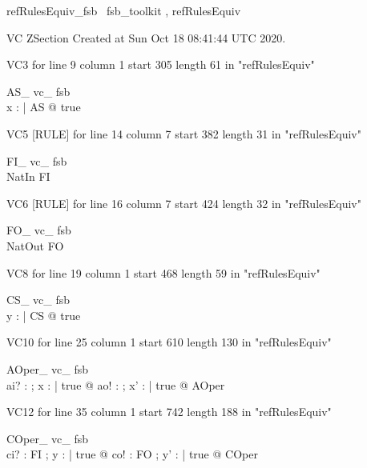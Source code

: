 \documentclass{article}
\begin{document}

\begin{zsection}	 \SECTION refRulesEquiv\_fsb \parents~fsb\_toolkit , refRulesEquiv
\end{zsection}

VC ZSection Created at Sun Oct 18 08:41:44 UTC 2020.

VC3 for line 9 column 1 start 305 length 61 in "refRulesEquiv"
\begin{theorem}{ AS\_ vc\_ fsb}\\
 \exists x : \power \nat | AS @ true \\

\end{theorem}

VC5 [RULE] for line 14 column 7 start 382 length 31 in "refRulesEquiv"
\begin{theorem}{ FI\_ vc\_ fsb}\\
 NatIn \in \nat \inj FI \\

\end{theorem}

VC6 [RULE] for line 16 column 7 start 424 length 32 in "refRulesEquiv"
\begin{theorem}{ FO\_ vc\_ fsb}\\
 NatOut \in \nat \inj FO \\

\end{theorem}

VC8 for line 19 column 1 start 468 length 59 in "refRulesEquiv"
\begin{theorem}{ CS\_ vc\_ fsb}\\
 \exists y : \seq \nat | CS @ true \\

\end{theorem}

VC10 for line 25 column 1 start 610 length 130 in "refRulesEquiv"
\begin{theorem}{ AOper\_ vc\_ fsb}\\
 \forall ai? : \nat ; x : \power \nat | true @ \exists ao! : \nat ; x' : \power \nat | true @ AOper \\

\end{theorem}

VC12 for line 35 column 1 start 742 length 188 in "refRulesEquiv"
\begin{theorem}{ COper\_ vc\_ fsb}\\
 \forall ci? : FI ; y : \seq \nat | true @ \exists co! : FO ; y' : \seq \nat | true @ COper \\

\end{theorem}
\end{document}
